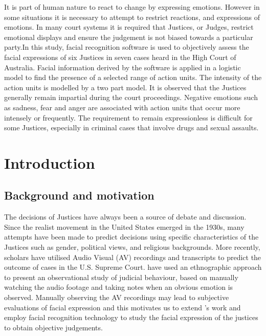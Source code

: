 \documentclass{monashthesis}
\begin{document}
It is part of human nature to react to change by expressing emotions. However in some situations it is necessary to attempt to restrict reactions, and expressions of emotions.
In many court systems it is required that Justices, or Judges, restrict emotional displays and ensure the judgement is not biased towards a particular party.In this study, facial recognition software is used to objectively assess the facial expressions of six Justices in seven cases heard in the High Court of Australia. Facial information derived by the software is applied in a logistic model to find the presence of a selected range of action units. The intensity of the action units is modelled by a two part model. It is observed that the Justices generally remain impartial during the court proceedings. Negative emotions such as sadness, fear and anger are associated with action units that occur more intensely or frequently. The requirement to remain expressionless is difficult for some Justices, especially in criminal cases that involve drugs and sexual assaults.

\clearpage{}\setcounter{page}{1}
\let\cleardoublepage\clearpage

\hypertarget{ch:intro}{%
\chapter{Introduction}\label{ch:intro}}

\hypertarget{background-and-motivation}{%
\section{Background and motivation}\label{background-and-motivation}}

The decisions of Justices have always been a source of debate and discussion. Since the realist movement in the United States emerged in the 1930s, many attempts have been made to predict decisions using specific characteristics of the Justices such as gender, political views, and religious backgrounds. More recently, scholars \autocites{Shullman2004illusion}{chen2016justice} have utilised Audio Visual (AV) recordings and transcripts to predict the outcome of cases in the U.S. Supreme Court. \textcite{tutton2018judicial} have used an ethnographic approach to present an observational study of judicial behaviour, based on manually watching the audio footage and taking notes when an obvious emotion is observed. Manually observing the AV recordings may lead to subjective evaluations of facial expression and this motivates us to extend \textcite{tutton2018judicial}'s work and employ facial recognition technology to study the facial expression of the justices to obtain objective judgements.
\end{document}
